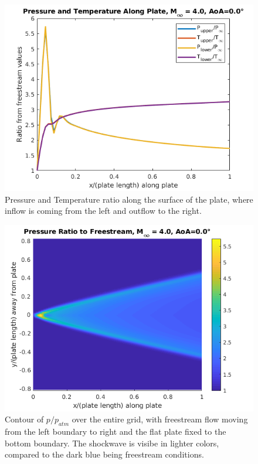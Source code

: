 \documentclass[10pt,a4paper]{article}
\begin{document}
\begin{figure}[!htb]
	\begin{center}
		\includegraphics[scale=0.7]{images/TwoPlate_PresTemp_0AoA.png} 
		\caption{Pressure and Temperature ratio along the surface of the plate, where inflow is coming from the left and outflow to the right.}
		\label{fig:TwoPlate_PresTemp_0AoA}
	\end{center}
\end{figure}

\begin{figure}[!htb]
	\begin{center}
		\includegraphics[scale=0.7]{images/TwoPlate_PresMap_0AoA.png} 
		\caption{Contour of $p/p_{atm}$ over the entire grid, with freestream flow moving from the left boundary to right and the flat plate fixed to the bottom boundary. The shockwave is visibe in lighter colors, compared to the dark blue being freestream conditions.}
		\label{fig:TwoPlate_PresMap_0AoA}
	\end{center}
\end{figure}
\end{document}
